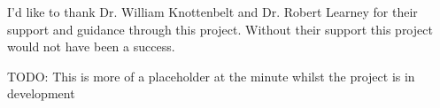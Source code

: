 \abstract

\thispagestyle{plain}
\setcounter{page}{2}

I'd like to thank Dr. William Knottenbelt and Dr. Robert Learney for their support and guidance through this project. Without their support this project would not have been a success.

TODO: This is more of a placeholder at the minute whilst the project is in development
